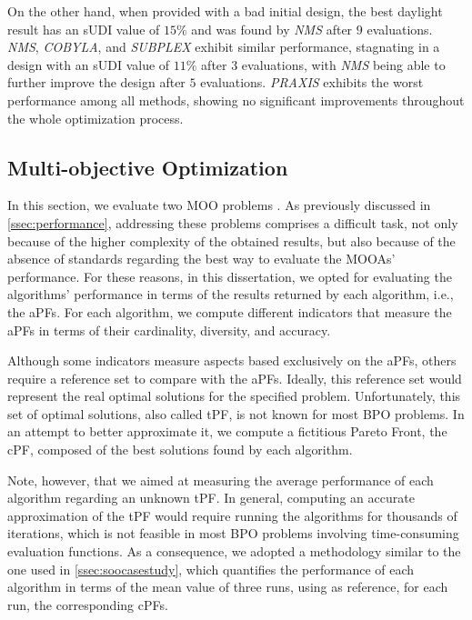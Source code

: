 On the other hand, when provided with a bad initial design, the best daylight result has an \ac{sUDI} value of $15\%$ and was found by \textit{NMS} after $9$ evaluations. \textit{NMS}, \textit{COBYLA}, and \textit{SUBPLEX} exhibit similar performance, stagnating in a design with an \ac{sUDI} value of $11\%$ after $3$ evaluations, with \textit{NMS} being able to further improve the design after $5$ evaluations. \textit{PRAXIS} exhibits the worst performance among all methods, showing no significant improvements throughout the whole optimization process.


\subsection{Multi-objective Optimization}

In this section, we evaluate two \ac{MOO} problems \cite{Belem2019MOO,IP2019MOO}. As previously discussed in \cref{ssec:performance}, addressing these problems comprises a difficult task, not only because of the higher complexity of the obtained results, but also because of the absence of standards regarding the best way to evaluate the \acp{MOOA}' performance. For these reasons, in this dissertation, we opted for evaluating the algorithms' performance in terms of the results returned by each algorithm, i.e., the \acp{aPF}. For each algorithm, we compute different indicators that measure the \acp{aPF} in terms of their cardinality, diversity, and accuracy.%

Although some indicators measure aspects based exclusively on the \acp{aPF}, others require a reference set to compare with the \acp{aPF}. Ideally, this reference set would represent the real optimal solutions for the specified problem. Unfortunately, this set of optimal solutions, also called \ac{tPF}, is not known for most \ac{BPO} problems. In an attempt to better approximate it, we compute a fictitious Pareto Front, the \ac{cPF}, composed of the best solutions found by each algorithm. 

Note, however, that we aimed at measuring the average performance of each algorithm regarding an unknown \ac{tPF}. In general, computing an accurate approximation of the \ac{tPF} would require running the algorithms for thousands of iterations, which is not feasible in most \ac{BPO} problems involving time-consuming evaluation functions. As a consequence, we adopted a methodology similar to the one used in \cref{ssec:soocasestudy}, which quantifies the performance of each algorithm in terms of the mean value of three runs, using as reference, for each run, the corresponding \acp{cPF}. 

